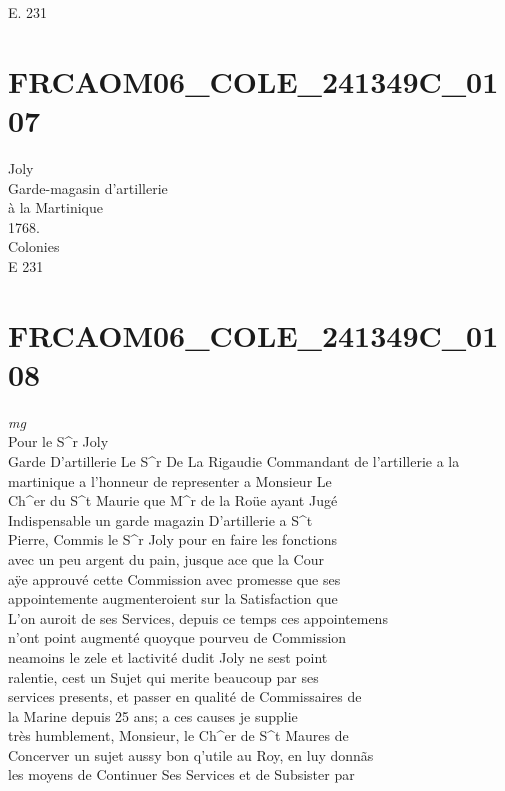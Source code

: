 \documentclass{article}
\begin{document}
\begin{pages}
E. 231
\pend
\endnumbering\beginnumbering\section{FRCAOM06\_COLE\_241349C\_0107}\pstart
Joly\\
Garde-magasin d'artillerie\\
à la Martinique\\
1768.\\
Colonies\\
E 231
\pend
\endnumbering\beginnumbering\section{FRCAOM06\_COLE\_241349C\_0108}
\vspace{0.5cm}\noindent
\textit{mg}
\footnotesize \\
Pour le S\^{}r Joly\\
Garde D'artillerie
\normalsize \pstart
Le S\^{}r De La Rigaudie Commandant de l'artillerie a la\\
martinique a l'honneur de representer a Monsieur Le\\
Ch\^{}er du S\^{}t Maurie que M\^{}r de la Roüe ayant Jugé\\
Indispensable un garde magazin D'artillerie a S\^{}t\\
Pierre, Commis le S\^{}r Joly pour en faire les fonctions\\
avec un peu argent du pain, jusque ace que la Cour\\
aÿe approuvé cette Commission avec promesse que ses\\
appointemente augmenteroient sur la Satisfaction que\\
L'on auroit de ses Services, depuis ce temps ces appointemens\\
n'ont point augmenté quoyque pourveu de Commission\\
neamoins le zele et lactivité dudit Joly ne sest point\\
ralentie, cest un Sujet qui merite beaucoup par ses\\
services presents, et passer en qualité de Commissaires de\\
la Marine depuis 25 ans; a ces causes je supplie\\
très humblement, Monsieur, le Ch\^{}er de S\^{}t Maures de\\
Concerver un sujet aussy bon q'utile au Roy, en luy donnãs\\
les moyens de Continuer Ses Services et de Subsister par\\

\end{pages}
\end{document}
